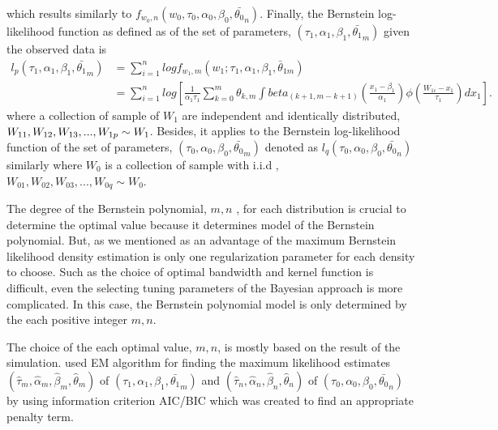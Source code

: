 which results similarly to $f_{w_0,n}(w_0, \tau_0, \alpha_0, \beta_0, \bar{\theta_0}_{n})$. Finally, the Bernstein log-likelihood function as defined as \cite{guan2016efficient} of the set of parameters, $(\tau_1, \alpha_1, \beta_1, \bar{\theta_1}_{m})$ given the observed data is
\begin{equation}
\begin{split}
l_p(\tau_1, \alpha_1, \beta_1,\bar{\theta_1}_m) &=\sum_{i=1}^{n} log  f_{w_1,m}(w_1; \tau_1, \alpha_1, \beta_1, \bar \theta_{1m})\\
&=\sum_{i=1}^{n} log \displaystyle \left[\frac{1}{\alpha_1\tau_1} \displaystyle \sum_{k=0}^m \theta_{k,m} \int beta _{(k+1, m-k+1)}\left(\frac{x_1-\beta_1}{\alpha_1}\right)\phi \displaystyle\left(\frac{W_{1i}-x_1}{\tau_1}\right) dx_1 \right].
\end{split}
\end{equation}
where a collection of sample of $W_1$ are independent and identically distributed, $W_{11}, W_{12}\\, W_{13},..., W_{1p}\sim W_1$. Besides, it applies to the Bernstein log-likelihood function of the set of parameters, $(\tau_0, \alpha_0, \beta_0, \bar{\theta_0}_{m})$  denoted as $l_q(\tau_0, \alpha_0, \beta_0, \bar{\theta_0}_{n})$  similarly where $W_0$ is a collection of sample with i.i.d , $W_{01}, W_{02}, W_{03},..., W_{0q}\sim W_0$.

The degree of the Bernstein polynomial,  $m,n$ , for each distribution is crucial to determine the optimal value because it determines model of the Bernstein polynomial. But, as we mentioned as an advantage of the maximum Bernstein likelihood density estimation is only one regularization parameter for each density to choose. Such as the choice of optimal bandwidth and kernel function is difficult, even the selecting tuning parameters of the Bayesian approach is more complicated. In this case, the Bernstein polynomial model is only determined by the each positive integer $m,n$.

The choice of the each optimal value, $m,n$, is mostly based on the result of the simulation. \cite{guan2016efficient} used EM algorithm for finding the maximum likelihood estimates $(\hat{\tau}_m,\hat{\alpha}_m, \hat{\beta}_m, \hat{\theta}_m)$ of $(\tau_1,\alpha_1,\beta_1,\bar{\theta_1}_m)$ and $(\hat{\tau}_n,\hat{\alpha}_n, \hat{\beta}_n, \hat{\theta}_n)$ of $(\tau_0,\alpha_0,\beta_0,\bar{\theta_0}_n)$  by using information criterion AIC/BIC which was created to find an appropriate penalty term.
